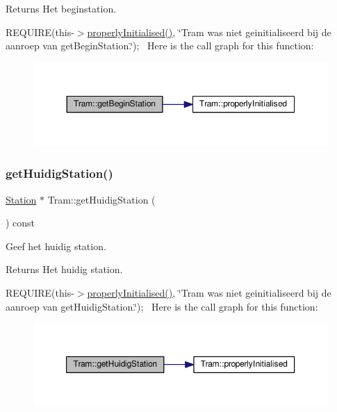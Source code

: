 \begin{DoxyReturn}{Returns}
Het beginstation.
\end{DoxyReturn}
R\+E\+Q\+U\+I\+RE(this-\/$>$\hyperlink{class_tram_ac2688f590e4db232b4f535c9bf959efb}{properly\+Initialised()}, \char`\"{}\+Tram was niet geinitialiseerd bij de aanroep van get\+Begin\+Station.\char`\"{});~\newline
Here is the call graph for this function\+:
\nopagebreak
\begin{figure}[H]
\begin{center}
\leavevmode
\includegraphics[width=350pt]{class_tram_abe386592de6a7930df75ea184b945403_cgraph}
\end{center}
\end{figure}
\mbox{\label{class_tram_ad04f5905ffec6ef4069b27f08c63f4b9}} 
\subsubsection{\texorpdfstring{get\+Huidig\+Station()}{getHuidigStation()}}
{\footnotesize\ttfamily \hyperlink{class_station}{Station} $\ast$ Tram\+::get\+Huidig\+Station (\begin{DoxyParamCaption}{ }\end{DoxyParamCaption}) const}



Geef het huidig station. 

\begin{DoxyReturn}{Returns}
Het huidig station.
\end{DoxyReturn}
R\+E\+Q\+U\+I\+RE(this-\/$>$\hyperlink{class_tram_ac2688f590e4db232b4f535c9bf959efb}{properly\+Initialised()}, \char`\"{}\+Tram was niet geinitialiseerd bij de aanroep van get\+Huidig\+Station.\char`\"{});~\newline
Here is the call graph for this function\+:
\nopagebreak
\begin{figure}[H]
\begin{center}
\leavevmode
\includegraphics[width=350pt]{class_tram_ad04f5905ffec6ef4069b27f08c63f4b9_cgraph}
\end{center}
\end{figure}
\mbox{\label{class_tram_a678ba2cd0c6ab76e966947944f599d56}} 
